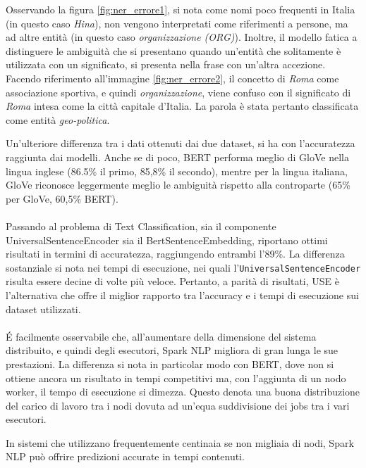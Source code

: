 Osservando la figura \ref{fig:ner_errore1}, si nota come nomi poco frequenti in Italia (in questo caso \textit{Hina}), non vengono interpretati come riferimenti a persone, ma ad altre entità (in questo caso \textit{organizzazione (ORG)}).
Inoltre, il modello fatica a distinguere le ambiguità che si presentano quando un'entità che solitamente è utilizzata con un significato, si presenta nella frase con un'altra accezione. Facendo riferimento all'immagine \ref{fig:ner_errore2}, il concetto di \textit{Roma} come associazione sportiva, e quindi \textit{organizzazione}, viene confuso con il significato di \textit{Roma} intesa come la città capitale d'Italia. La parola è stata pertanto classificata come entità \textit{geo-politica}.
 

Un'ulteriore differenza tra i dati ottenuti dai due dataset, si ha con l'accuratezza raggiunta dai modelli. Anche se di poco, BERT performa meglio di GloVe nella lingua inglese (86.5\% il primo, 85,8\% il secondo), mentre per la lingua italiana, GloVe riconosce leggermente meglio le ambiguità rispetto alla controparte (65\% per GloVe, 60,5\% BERT).\\
\\
Passando al problema di Text Classification, sia il componente UniversalSentenceEncoder sia il BertSentenceEmbedding, riportano ottimi risultati in termini di accuratezza, raggiungendo entrambi l'89\%. La differenza sostanziale si nota nei tempi di esecuzione, nei quali l'\verb|UniversalSentenceEncoder| risulta essere decine di volte più veloce. Pertanto, a parità di risultati, USE è l'alternativa che offre il miglior rapporto tra l'accuracy e i tempi di esecuzione sui dataset utilizzati.\\
\\
É facilmente osservabile che, all'aumentare della dimensione del sistema distribuito, e quindi degli esecutori, Spark NLP migliora di gran lunga le sue prestazioni. La differenza si nota in particolar modo con BERT, dove non si ottiene ancora un risultato in tempi competitivi ma, con l'aggiunta di un nodo worker, il tempo di esecuzione si dimezza. Questo denota una buona distribuzione del carico di lavoro tra i nodi dovuta ad un'equa suddivisione dei jobs tra i vari esecutori. 

In sistemi che utilizzano frequentemente centinaia se non migliaia di nodi, Spark NLP può offrire predizioni accurate in tempi contenuti.